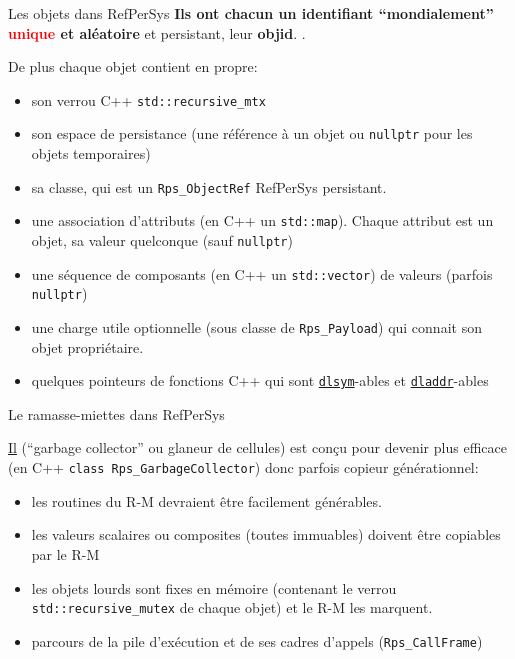 \documentclass[final,a4,xcolor={svgnames,dvipsnames}]{beamer}
\begin{document}
 
 \begin{frame}{Les objets dans RefPerSys}
   \textbf{Ils ont chacun un identifiant ``mondialement''
     \textcolor{red}{unique} et aléatoire} et persistant, leur
   \textbf{objid}. .

   \medskip
   
   \begin{relsize}{-0.5}
   De plus chaque objet contient en propre:
   \begin{itemize}
   \item son verrou C++ \texttt{std::recursive\_mtx}
     \item son espace de persistance (une référence à un objet ou \texttt{nullptr} pour les objets temporaires)
     \item sa classe, qui est un \texttt{Rps\_ObjectRef} RefPerSys persistant.
     \item une association d'attributs (en C++ un
       \texttt{std::map}). Chaque attribut est un objet, sa valeur
       quelconque (sauf \texttt{nullptr})
     \item une séquence de composants (en C++ un \texttt{std::vector}) de valeurs (parfois \texttt{nullptr})
       \item une charge utile optionnelle (sous classe de
         \texttt{Rps\_Payload}) qui connait son objet propriétaire.
       \item quelques pointeurs de fonctions C++ qui sont
         \href{https://man7.org/linux/man-pages/man3/dlsym.3.html}{\texttt{dlsym}}-ables
         et
         \href{https://man7.org/linux/man-pages/man3/dladdr.3.html}{\texttt{dladdr}}-ables
   \end{itemize}
   \end{relsize}
   \end{frame}

 \begin{frame}{Le ramasse-miettes dans RefPerSys}
   
   \href{https://fr.wikipedia.org/wiki/Ramasse-miettes_(informatique)}{Il}
   (``garbage collector'' ou glaneur de cellules) est conçu pour
   devenir plus efficace (en C++ \texttt{class Rps\_GarbageCollector})
   donc parfois copieur générationnel:

   \begin{itemize}
   \item les routines du R-M devraient être facilement générables.
   \item les valeurs scalaires ou composites (toutes immuables)
     doivent être copiables par le R-M
   \item les objets lourds sont fixes en mémoire (contenant le verrou \texttt{std::recursive\_mutex} de chaque objet) et le R-M les marquent.
     \item parcours de la pile d'exécution et de ses cadres d'appels (\texttt{Rps\_CallFrame})
   \end{itemize}
 \end{frame}
 
\end{document}
